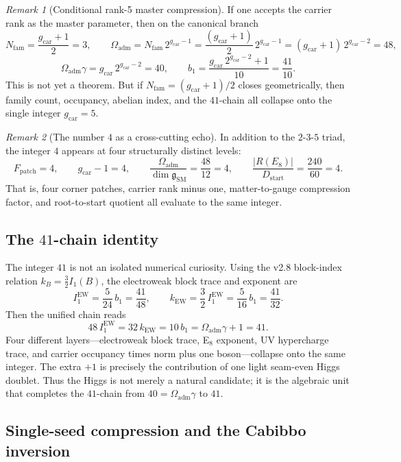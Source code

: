\documentclass[11pt,a4paper]{article}
\theoremstyle{definition}
\theoremstyle{remark}
\newtheorem*{remark}{Remark}
\newcommand{\bone}{b_1}
\newcommand{\SM}{\mathrm{SM}}
\newcommand{\Oadm}{\Omega_{\mathrm{adm}}}
\newcommand{\gcar}{g_{\mathrm{car}}}
\newcommand{\Dstart}{D_{\mathrm{start}}}
\begin{document}
\begin{remark}[Conditional rank-5 master compression]
If one accepts the carrier rank as the master parameter, then on the canonical branch
\[
N_{\mathrm{fam}}=\frac{\gcar+1}{2}=3,
\qquad
\Oadm=N_{\mathrm{fam}}\,2^{\gcar-1}=\frac{(\gcar+1)}{2}\,2^{\gcar-1}=(\gcar+1)\,2^{\gcar-2}=48,
\]
\[
\Oadm\gamma=\gcar\,2^{\gcar-2}=40,
\qquad
\bone=\frac{\gcar\,2^{\gcar-2}+1}{10}=\frac{41}{10}.
\]
This is not yet a theorem. But if $N_{\mathrm{fam}}=(\gcar+1)/2$ closes geometrically, then family count, occupancy, abelian index, and the $41$-chain all collapse onto the single integer $\gcar=5$.
\end{remark}

\begin{remark}[The number $4$ as a cross-cutting echo]
In addition to the $2$-$3$-$5$ triad, the integer $4$ appears at four structurally distinct levels:
\[
F_{\mathrm{patch}}=4,
\qquad
\gcar-1=4,
\qquad
\frac{\Oadm}{\dim\mathfrak g_{\SM}}=\frac{48}{12}=4,
\qquad
\frac{|R(E_8)|}{\Dstart}=\frac{240}{60}=4.
\]
That is, four corner patches, carrier rank minus one, matter-to-gauge compression factor, and root-to-start quotient all evaluate to the same integer.
\end{remark}

\subsection{The $41$-chain identity}

The integer $41$ is not an isolated numerical curiosity. Using the v2.8 block-index relation $k_B=\frac32 I_1(B)$, the electroweak block trace and exponent are
\[
I_1^{\mathrm{EW}}=\frac{5}{24}\,\bone=\frac{41}{48},
\qquad
k_{\mathrm{EW}}=\frac32\,I_1^{\mathrm{EW}}=\frac{5}{16}\,\bone=\frac{41}{32}.
\]
Then the unified chain reads
\begin{equation}
\label{eq:41-chain-main}
48\,I_1^{\mathrm{EW}}
=32\,k_{\mathrm{EW}}
=10\,\bone
=\Oadm\gamma+1
=41.
\end{equation}
Four different layers---electroweak block trace, E$_8$ exponent, UV hypercharge trace, and carrier occupancy times norm plus one boson---collapse onto the same integer. The extra $+1$ is precisely the contribution of one light seam-even Higgs doublet. Thus the Higgs is not merely a natural candidate; it is the algebraic unit that completes the $41$-chain from $40=\Oadm\gamma$ to $41$.

\subsection{Single-seed compression and the Cabibbo inversion}
\end{document}
